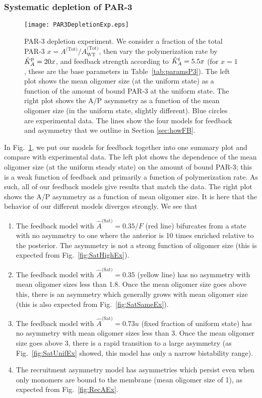 \documentclass[11pt]{article}
\newcommand{\red}[1]{\color{red}#1\normalcolor}
\newcommand{\6}[1]{#1_{\text{6}}}
\newcommand{\3}[1]{#1_{\text{3}}}
\newcommand{\Tot}[1]{#1^\text{(Tot)}}
\newcommand{\Sat}[1]{#1^\text{(Sat)}}
\begin{document}
\subsubsection{Systematic depletion of PAR-3}

\begin{figure}
\centering
\texttt{[image: PAR3DepletionExp.eps]}
\caption{\label{fig:P3Depl}PAR-3 depletion experiment. We consider a fraction of the total PAR-3 $x=\Tot{A}/\Tot{A}_\text{WT}$, then vary the polymerization rate by $\hat{K}^\text{p}_A=20x$, and feedback strength according to $\hat{K}^\text{f}_A=5.5x$ (for $x=1$, these are the base parameters in Table\ \ref{tab:paramsP3}). The left plot shows the mean oligomer size (at the uniform state) as a function of the amount of bound PAR-3 at the uniform state. The right plot shows the A/P asymmetry as a function of the mean oligomer size \red{(in the uniform state, slightly different)}. Blue circles are experimental data. The lines show the four models for feedback and asymmetry that we outline in Section \ref{sec:howFB}.}
\end{figure}

In Fig.\ \ref{fig:P3Depl}, we put our models for feedback together into one summary plot and compare with experimental data. The left plot shows the dependence of the mean oligomer size (at the uniform steady state) on the amount of bound PAR-3; this is a weak function of feedback and primarily a function of polymerization rate. As such, all of our feedback models give results that match the data. The right plot shows the A/P asymmetry as a function of mean oligomer size. It is here that the behavior of our different models diverges strongly. We see that 
\begin{enumerate}
\item The feedback model with $\Sat{\hat A}=0.35/F$ (red line) bifurcates from a state with no asymmetry to one where the anterior is 10 times enriched relative to the posterior. The asymmetry is not a strong function of oligomer size (this is expected from Fig.\ \ref{fig:SatHighEx}).
\item The feedback model with $\Sat{\hat A}=0.35$ (yellow line) has no asymmetry with mean oligomer sizes less than 1.8. Once the mean oligomer size goes above this, there is an asymmetry which generally grows with mean oligomer size  (this is also expected from Fig.\ \ref{fig:SatSameEx}).
\item The feedback model with $\Sat{\hat A}=0.73u$ (fixed fraction of uniform state) has no asymmetry with mean oligomer sizes less than 3. Once the mean oligomer size goes above 3, there is a rapid transition to a large asymmetry (as Fig.\ \ref{fig:SatUnifEx} showed, this model has only a narrow bistability range). 
\item The recruitment asymmetry model has asymmetries which persist even when only monomers are bound to the membrane (mean oligomer size of 1), as expected from Fig.\ \ref{fig:RecAEx}.
\end{enumerate}
\end{document}

